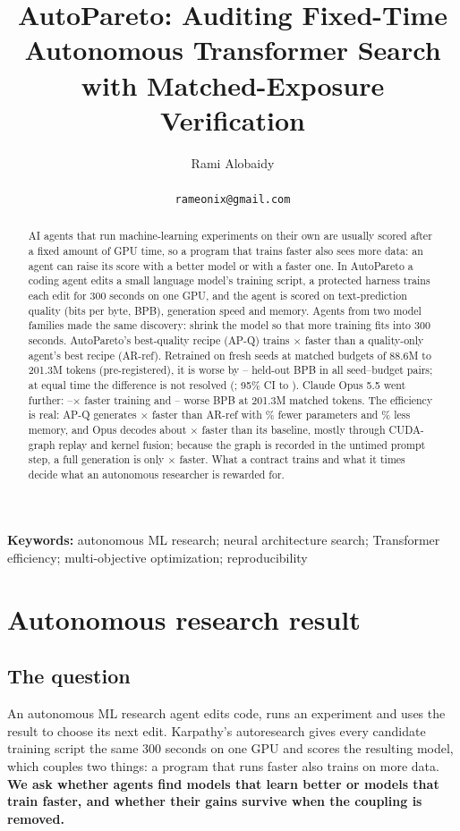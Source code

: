 \documentclass{article}
\title{AutoPareto: Auditing Fixed-Time Autonomous Transformer Search\\with Matched-Exposure Verification}
\author{Rami Alobaidy\\ \authortodo{affiliation: author to confirm}\\ \texttt{rameonix@gmail.com}}
\begin{document}
\maketitle
\begin{abstract}
AI agents that run machine-learning experiments on their own are usually scored after a fixed amount of GPU time, so a program that trains faster also sees more data: an agent can raise its score with a better model or with a faster one.
In AutoPareto a coding agent edits a small language model's training script, a protected harness trains each edit for 300 seconds on one GPU, and the agent is scored on text-prediction quality (bits per byte, BPB), generation speed and memory.
Agents from two model families made the same discovery: shrink the model so that more training fits into 300 seconds.
AutoPareto's best-quality recipe (AP-Q) trains \CREOneRho$\times$ faster than a quality-only agent's best recipe (AR-ref). Retrained on fresh seeds at matched budgets of 88.6M to 201.3M tokens (pre-registered), it is worse by \CREOneMatchedLoAbs--\CREOneMatchedHiAbs{} held-out BPB in all \CREOnePairs{} seed--budget pairs; at equal time the difference is not resolved (\CREOneTimeHeldThree; 95\% CI \CREOneTimeHeldLo{} to \CREOneTimeHeldHi).
Claude Opus 5.5 went further: \CRMTRhoLo--\CRMTRhoHi$\times$ faster training and \CRMTDLoAbs--\CRMTDHiAbs{} worse BPB at 201.3M matched tokens.
The efficiency is real: AP-Q generates \CRDecodeRatio$\times$ faster than AR-ref with \CRParamReduction\% fewer parameters and \CRMemoryReduction\% less memory, and Opus decodes about \CRIATotalMed$\times$ faster than its baseline, mostly through CUDA-graph replay and kernel fusion; because the graph is recorded in the untimed prompt step, a full generation is only \CRIAEtoEMed$\times$ faster.
What a contract trains and what it times decide what an autonomous researcher is rewarded for.
\end{abstract}

\noindent\textbf{Keywords:} autonomous ML research; neural architecture search; Transformer efficiency; multi-objective optimization; reproducibility

\section{Autonomous research result}\label{partone}

\subsection{The question}\label{sec:question}
An autonomous ML research agent edits code, runs an experiment and uses the result to choose its next edit. Karpathy's autoresearch \citep{autoresearch} gives every candidate training script the same 300 seconds on one GPU and scores the resulting model, which couples two things: a program that runs faster also trains on more data. \textbf{We ask whether agents find models that learn better or models that train faster, and whether their gains survive when the coupling is removed.}
\end{document}
